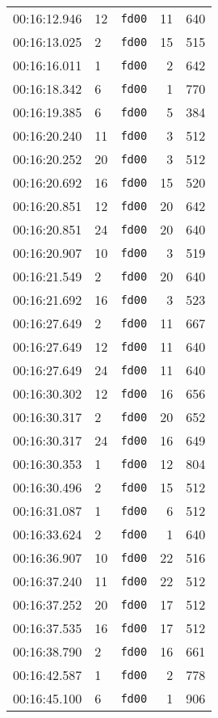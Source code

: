\documentclass{article}
\begin{document}
\begin{longtable}{lllrr}
00:16:12.946 & 12 & \texttt{fd00} & 11 & 640 \\
00:16:13.025 & 2 & \texttt{fd00} & 15 & 515 \\
00:16:16.011 & 1 & \texttt{fd00} & 2 & 642 \\
00:16:18.342 & 6 & \texttt{fd00} & 1 & 770 \\
00:16:19.385 & 6 & \texttt{fd00} & 5 & 384 \\
00:16:20.240 & 11 & \texttt{fd00} & 3 & 512 \\
00:16:20.252 & 20 & \texttt{fd00} & 3 & 512 \\
00:16:20.692 & 16 & \texttt{fd00} & 15 & 520 \\
00:16:20.851 & 12 & \texttt{fd00} & 20 & 642 \\
00:16:20.851 & 24 & \texttt{fd00} & 20 & 640 \\
00:16:20.907 & 10 & \texttt{fd00} & 3 & 519 \\
00:16:21.549 & 2 & \texttt{fd00} & 20 & 640 \\
00:16:21.692 & 16 & \texttt{fd00} & 3 & 523 \\
00:16:27.649 & 2 & \texttt{fd00} & 11 & 667 \\
00:16:27.649 & 12 & \texttt{fd00} & 11 & 640 \\
00:16:27.649 & 24 & \texttt{fd00} & 11 & 640 \\
00:16:30.302 & 12 & \texttt{fd00} & 16 & 656 \\
00:16:30.317 & 2 & \texttt{fd00} & 20 & 652 \\
00:16:30.317 & 24 & \texttt{fd00} & 16 & 649 \\
00:16:30.353 & 1 & \texttt{fd00} & 12 & 804 \\
00:16:30.496 & 2 & \texttt{fd00} & 15 & 512 \\
00:16:31.087 & 1 & \texttt{fd00} & 6 & 512 \\
00:16:33.624 & 2 & \texttt{fd00} & 1 & 640 \\
00:16:36.907 & 10 & \texttt{fd00} & 22 & 516 \\
00:16:37.240 & 11 & \texttt{fd00} & 22 & 512 \\
00:16:37.252 & 20 & \texttt{fd00} & 17 & 512 \\
00:16:37.535 & 16 & \texttt{fd00} & 17 & 512 \\
00:16:38.790 & 2 & \texttt{fd00} & 16 & 661 \\
00:16:42.587 & 1 & \texttt{fd00} & 2 & 778 \\
00:16:45.100 & 6 & \texttt{fd00} & 1 & 906 \\

\end{longtable}
\end{document}

